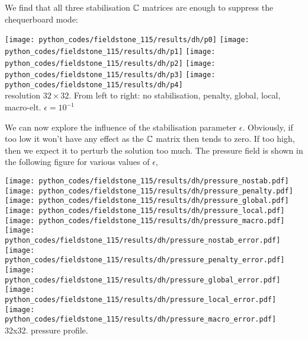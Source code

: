We find that all three stabilisation ${\mathbb{C}}$ matrices are enough to suppress the chequerboard mode:
\begin{center}
\texttt{[image: python\_codes/fieldstone\_115/results/dh/p0]}
\texttt{[image: python\_codes/fieldstone\_115/results/dh/p1]}
\texttt{[image: python\_codes/fieldstone\_115/results/dh/p2]}
\texttt{[image: python\_codes/fieldstone\_115/results/dh/p3]}
\texttt{[image: python\_codes/fieldstone\_115/results/dh/p4]}\\
{\captionfont resolution $32\times 32$. From left to right: no stabilisation, penalty, 
global, local, macro-elt. $\epsilon=10^{-1}$}
\end{center}

We can now explore the influence of the stabilisation parameter $\epsilon$. Obviously, 
if too low it won't have any effect as the ${\mathbb{C}}$ matrix then tends to zero. If too high,
then we expect it to perturb the solution too much. 
The pressure field is shown in the following figure for various values of $\epsilon$, 


\begin{center}
\texttt{[image: python\_codes/fieldstone\_115/results/dh/pressure\_nostab.pdf]}
\texttt{[image: python\_codes/fieldstone\_115/results/dh/pressure\_penalty.pdf]}
\texttt{[image: python\_codes/fieldstone\_115/results/dh/pressure\_global.pdf]}
\texttt{[image: python\_codes/fieldstone\_115/results/dh/pressure\_local.pdf]}
\texttt{[image: python\_codes/fieldstone\_115/results/dh/pressure\_macro.pdf]}\\
\texttt{[image: python\_codes/fieldstone\_115/results/dh/pressure\_nostab\_error.pdf]}
\texttt{[image: python\_codes/fieldstone\_115/results/dh/pressure\_penalty\_error.pdf]}
\texttt{[image: python\_codes/fieldstone\_115/results/dh/pressure\_global\_error.pdf]}
\texttt{[image: python\_codes/fieldstone\_115/results/dh/pressure\_local\_error.pdf]}
\texttt{[image: python\_codes/fieldstone\_115/results/dh/pressure\_macro\_error.pdf]}\\
{\captionfont 32x32. pressure profile.} 
\end{center}

